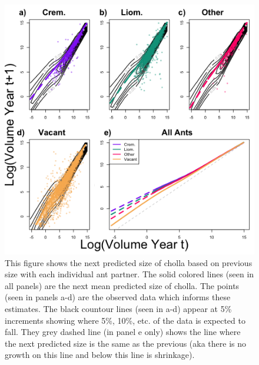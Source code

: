 \documentclass[11pt]{article}
\begin{document}
\begin{figure}
	\includegraphics[width = 0.95\linewidth]{Figures/grow_contour_v2.png}
	\caption{This figure shows the next predicted size of cholla based on previous size with each individual ant partner. The solid colored lines (seen in all panels) are the next mean predicted size of cholla. The points (seen in panels a-d) are the observed data which informs these estimates. The black countour lines (seen in a-d) appear at 5\% increments showing where 5\%, 10\%, etc. of the data is expected to fall. They grey dashed line (in panel e only) shows the line where the next predicted size is the same as the previous (aka there is no growth on this line and below this line is shrinkage). }
	\label{fig:Grow}
\end{figure}
\end{document}
